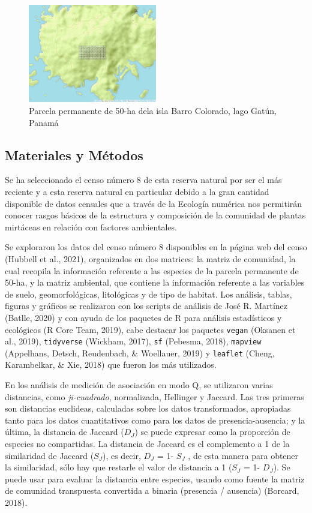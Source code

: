 \documentclass[11pt,]{article}
\begin{document}
\begin{figure}
\centering
\includegraphics[width=0.50000\textwidth]{mapa_cuadros.png}
\caption{Parcela permanente de 50-ha dela isla Barro Colorado, lago
Gatún, Panamá \label{fig:mapa_cuadros_bci}}
\end{figure}

\subsection{Materiales y Métodos}\label{materiales-y-muxe9todos}

Se ha seleccionado el censo número 8 de esta reserva natural por ser el
más reciente y a esta reserva natural en particular debido a la gran
cantidad disponible de datos censales que a través de la Ecología
numérica nos permitirán conocer rasgos básicos de la estructura y
composición de la comunidad de plantas mirtáceas en relación con
factores ambientales.

Se exploraron los datos del censo número 8 disponibles en la página web
del censo (Hubbell et al., 2021), organizados en dos matrices: la matriz
de comunidad, la cual recopila la información referente a las especies
de la parcela permanente de 50-ha, y la matriz ambiental, que contiene
la información referente a las variables de suelo, geomorfológicas,
litológicas y de tipo de habitat. Los análisis, tablas, figuras y
gráficos se realizaron con los scripts de análisis de José R. Martínez
(Batlle, 2020) y con ayuda de los paquetes de R para análisis
estadísticos y ecológicos (R Core Team, 2019), cabe destacar los
paquetes \texttt{vegan} (Oksanen et al., 2019), \texttt{tidyverse}
(Wickham, 2017), \texttt{sf} (Pebesma, 2018), \texttt{mapview}
(Appelhans, Detsch, Reudenbach, \& Woellauer, 2019) y \texttt{leaflet}
(Cheng, Karambelkar, \& Xie, 2018) que fueron los más utilizados.

En los análisis de medición de asociación en modo Q, se utilizaron
varias distancias, como \emph{ji-cuadrado}, normalizada, Hellinger y
Jaccard. Las tres primeras son distancias euclideas, calculadas sobre
los datos transformados, apropiadas tanto para los datos cuantitativos
como para los datos de presencia-ausencia; y la última, la distancia de
Jaccard (\(D_J\)) se puede expresar como la proporción de especies no
compartidas. La distancia de Jaccard es el complemento a 1 de la
similaridad de Jaccard (\(S_J\)), es decir, \(D_J\) = 1- \(S_J\) , de
esta manera para obtener la similaridad, sólo hay que restarle el valor
de distancia a 1 (\(S_J\) = 1- \(D_J\)). Se puede usar para evaluar la
distancia entre especies, usando como fuente la matriz de comunidad
transpuesta convertida a binaria (presencia / ausencia) (Borcard, 2018).
\end{document}
